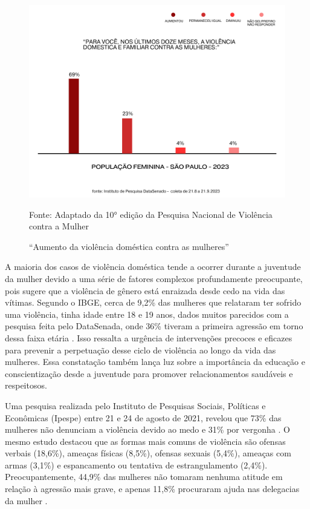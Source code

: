 \documentclass[
    article,			%
    12pt,				%
    oneside,            %
    a4paper,			%
    english,			%
    brazil,				%
    ]{abntex2}
\begin{document}
\begin{figure}[ht]
    \centering
    \includegraphics[width=12cm]{violencencia domestica e familiar.png}\\
    \caption{“Aumento da violência doméstica contra as mulheres”}
        Fonte: Adaptado da 10° edição da Pesquisa Nacional de Violência contra a Mulher
    \label{fig:infografico}
\end{figure}

    A maioria dos casos de violência doméstica tende a ocorrer durante a juventude da mulher devido a uma série de fatores complexos profundamente preocupante, pois sugere que a violência de gênero está enraizada desde cedo na vida das vítimas. Segundo o IBGE, cerca de 9,2\% das mulheres que relataram ter sofrido uma violência, tinha idade entre 18 e 19 anos, dados muitos parecidos com a pesquisa feita pelo DataSenada, onde 36\% tiveram a primeira agressão em torno dessa faixa etária \cite{IBGE} \cite{senadoSP_2023}. Isso ressalta a urgência de intervenções precoces e eficazes para prevenir a perpetuação desse ciclo de violência ao longo da vida das mulheres. Essa constatação também lança luz sobre a importância da educação e conscientização desde a juventude para promover relacionamentos saudáveis e respeitosos.

    Uma pesquisa realizada pelo Instituto de Pesquisas Sociais, Políticas e Econômicas (Ipespe) entre 21 e 24 de agosto de 2021, revelou que 73\% das mulheres não denunciam a violência devido ao medo e 31\% por vergonha \cite{violenciaemdados}. O mesmo estudo destacou que as formas mais comuns de violência são ofensas verbais (18,6\%), ameaças físicas (8,5\%), ofensas sexuais (5,4\%), ameaças com armas (3,1\%) e espancamento ou tentativa de estrangulamento (2,4\%). Preocupantemente, 44,9\% das mulheres não tomaram nenhuma atitude em relação à agressão mais grave, e apenas 11,8\% procuraram ajuda nas delegacias da mulher \cite{relatorio}.
\end{document}
